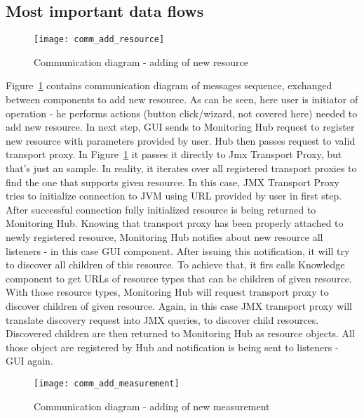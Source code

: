 \subsection{Most important data flows}



\begin{figure}[h]
  \centering
  \texttt{[image: comm\_add\_resource]}
  \caption{Communication diagram - adding of new resource}
  \label{fig:comm_add_resource}
\end{figure}

Figure~\ref{fig:comm_add_resource} contains communication diagram of messages sequence, exchanged between components to
add new resource. As can be seen, here user is initiator of operation - he performs actions (button click/wizard, not
covered here) needed to add new resource. In next step, GUI sends to Monitoring Hub request to register new resource
with parameters provided by user. Hub then passes request to valid transport proxy. In
Figure~\ref{fig:comm_add_resource} it passes it directly to Jmx Transport Proxy, but that's just an sample. In reality,
it iterates over all registered transport proxies to find the one that supports given resource. In this case, JMX
Transport Proxy tries to initialize connection to JVM using URL provided by user in first step. After successful
connection fully initialized resource is being returned to Monitoring Hub. Knowing that transport proxy has been
properly attached to newly registered resource, Monitoring Hub notifies about new resource all listeners - in this
case GUI component. After issuing this notification, it will try to discover all children of this resource. To
achieve that, it firs calls Knowledge component to get URLs of resource types that can be children of given resource.
With those resource types, Monitoring Hub will request transport proxy to discover children of given resource. 
Again, in this case JMX transport proxy will translate discovery request into JMX queries, to discover child resources.
Discovered children are then returned to Monitoring Hub as resource objects. All those object are registered by Hub and
notification is being sent to listeners - GUI again.


\begin{figure}[h]
  \centering
  \texttt{[image: comm\_add\_measurement]}
  \caption{Communication diagram - adding of new measurement}
  \label{fig:comm_add_measurement}
\end{figure}

